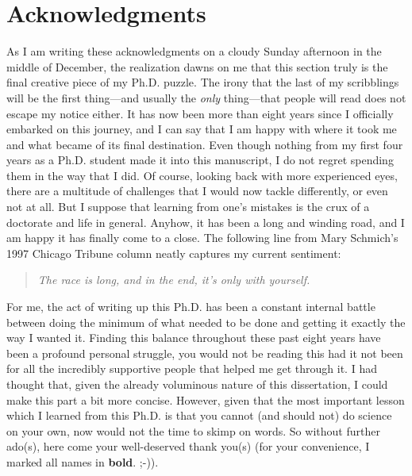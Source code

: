 \chapter*{Acknowledgments}
%
\label{ch:preface}
%
%

As I am writing these acknowledgments on a cloudy Sunday afternoon in the middle of December, the realization
dawns on me that this section truly is the final creative piece of my Ph.D. puzzle. The irony that the last of
my scribblings will be the first thing---and usually the \emph{only} thing---that people will read does not
escape my notice either. It has now been more than eight years since I officially embarked on this journey,
and I can say that I am happy with where it took me and what became of its final destination. Even though
nothing from my first four years as a Ph.D. student made it into this manuscript, I do not regret spending
them in the way that I did. Of course, looking back with more experienced eyes, there are a multitude of
challenges that I would now tackle differently, or even not at all. But I suppose that learning from one's
mistakes is the crux of a doctorate and life in general. Anyhow, it has been a long and winding road, and I
am happy it has finally come to a close. The following line from Mary Schmich's 1997 Chicago Tribune column
neatly captures my current sentiment:
%
\begin{quote}
\textit{The race is long, and in the end, it's only with yourself.}
\end{quote}
%
For me, the act of writing up this Ph.D. has been a constant internal battle between doing the minimum of what
needed to be done and getting it exactly the way I wanted it. Finding this balance throughout these past eight
years have been a profound personal struggle, you would not be reading this had it not been for all the
incredibly supportive people that helped me get through it. I had thought that, given the already voluminous
nature of this dissertation, I could make this part a bit more concise. However, given that the most important
lesson which I learned from this Ph.D. is that you cannot (and should not) do science on your own, now would
not the time to skimp on words. So without further ado(s), here come your well-deserved thank you(s) (for your
convenience, I marked all names in \textbf{bold}. ;-)).

